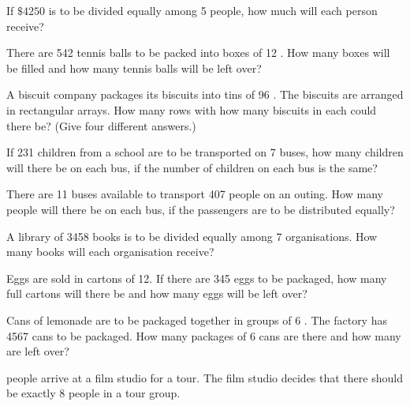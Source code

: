 \begin{exercises}
\begin{questions}
        \Question[2] If \(\$ 4250\) is to be divided equally among 5 people, how much will each person receive?
                \begin{solutionorbox}[1.5in]
                \end{solutionorbox}
        \Question[2] There are 542 tennis balls to be packed into boxes of 12 . How many boxes will be filled and how many tennis balls will be left over?
                \begin{solutionorbox}[1.5in]
                \end{solutionorbox}
        \Question[2] A biscuit company packages its biscuits into tins of 96 . The biscuits are arranged in rectangular arrays. How many rows with how many biscuits in each could there be? (Give four different answers.)
                \begin{solutionorbox}[1.5in]
                \end{solutionorbox}
        \Question[2] If 231 children from a school are to be transported on 7 buses, how many children will there be on each bus, if the number of children on each bus is the same?
                \begin{solutionorbox}[1.5in]
                \end{solutionorbox}
        \Question[2] There are 11 buses available to transport 407 people on an outing. How many people will there be on each bus, if the passengers are to be distributed equally?
                \begin{solutionorbox}[1.5in]
                \end{solutionorbox}
        \Question[2] A library of 3458 books is to be divided equally among 7 organisations. How many books will each organisation receive?
                \begin{solutionorbox}[1.5in]
                \end{solutionorbox}
        \Question[2] Eggs are sold in cartons of 12. If there are 345 eggs to be packaged, how many full cartons will there be and how many eggs will be left over?
                \begin{solutionorbox}[1.5in]
                \end{solutionorbox}
        \Question[2] Cans of lemonade are to be packaged together in groups of 6 . The factory has 4567 cans to be packaged. How many packages of 6 cans are there and how many are left over?
                \begin{solutionorbox}[1.5in]
                \end{solutionorbox}
         people arrive at a film studio for a tour. The film studio decides that there should be exactly 8 people in a tour group.
        \begin{parts}

\end{parts}
\end{questions}
\end{exercises}

